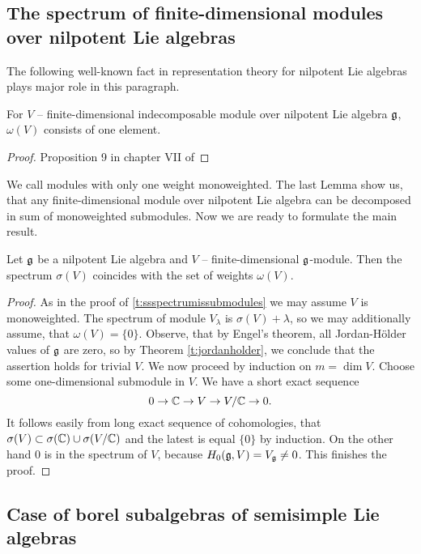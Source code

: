 \subsection{The spectrum of finite-dimensional modules over nilpotent Lie algebras}
The following well-known fact in representation theory for nilpotent Lie algebras plays major role
in this paragraph.
\begin{lemma} \label{l:nilpdecomp}
    For $V$ -- finite-dimensional indecomposable module over nilpotent Lie algebra $\mathfrak{g}$,
    $\omega(V)$ consists of one element.
\end{lemma}
\begin{proof}
    Proposition 9 in chapter VII of 
\end{proof}
We call modules with only one weight monoweighted. The last Lemma show us, that any
finite-dimensional module over nilpotent Lie algebra can be decomposed in sum of monoweighted
submodules.  Now we are ready to formulate the main result.
\begin{theorem}
    Let $\mathfrak{g}$ be a nilpotent Lie algebra and $V$ -- finite-dimensional $\mathfrak{g}$-module. Then the
    spectrum $\sigma(V)$ coincides with the set of weights $\omega(V)$.
\end{theorem}
\begin{proof}
    As in the proof of \ref{t:ssspectrumissubmodules} we may assume $V$ is monoweighted. The
    spectrum of module $V_{\lambda}$ is $\sigma(V) + \lambda$, so we may additionally assume, that
    $\omega(V) = \{0\}$. Observe, that by Engel's theorem, all Jordan-H{\"o}lder values of $\mathfrak{g}$
    are zero, so by Theorem \ref{t:jordanholder}, we conclude that the assertion holds for trivial
    $V$. We now proceed by induction on $m = \dim V$. Choose some one-dimensional submodule in $V$.
    We have a short exact sequence
    \[
        0\to \mathbb{C} \to V \to V/\mathbb{C} \to 0.
    \]
    It follows easily from long exact sequence of cohomologies, that $\sigma(V) \subset
    \sigma(\mathbb{C}) \cup \sigma(V/\mathbb{C})$ and the latest is equal $\{0\}$ by induction. On the other hand
    $0$ is in the spectrum of $V$, because $H_0(\mathfrak{g}, V) = V_{\mathfrak{g}} \neq 0$. This finishes the
    proof.
\end{proof}

\subsection{Case of borel subalgebras of semisimple Lie algebras}

